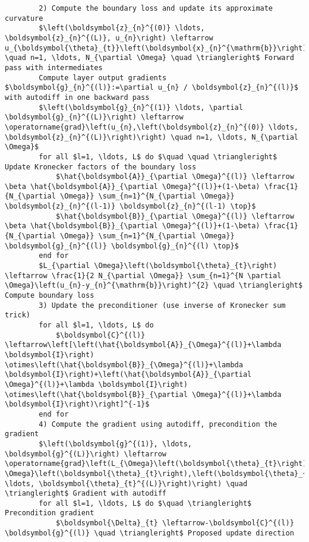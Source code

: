 \documentclass[10pt]{article}
\begin{document}
\begin{verbatim}
        2) Compute the boundary loss and update its approximate curvature
        $\left(\boldsymbol{z}_{n}^{(0)} \ldots, \boldsymbol{z}_{n}^{(L)}, u_{n}\right) \leftarrow u_{\boldsymbol{\theta}_{t}}\left(\boldsymbol{x}_{n}^{\mathrm{b}}\right) \quad n=1, \ldots, N_{\partial \Omega} \quad \triangleright$ Forward pass with intermediates
        Compute layer output gradients $\boldsymbol{g}_{n}^{(l)}:=\partial u_{n} / \boldsymbol{z}_{n}^{(l)}$ with autodiff in one backward pass
        $\left(\boldsymbol{g}_{n}^{(1)} \ldots, \partial \boldsymbol{g}_{n}^{(L)}\right) \leftarrow \operatorname{grad}\left(u_{n},\left(\boldsymbol{z}_{n}^{(0)} \ldots, \boldsymbol{z}_{n}^{(L)}\right)\right) \quad n=1, \ldots, N_{\partial \Omega}$
        for all $l=1, \ldots, L$ do $\quad \quad \triangleright$ Update Kronecker factors of the boundary loss
            $\hat{\boldsymbol{A}}_{\partial \Omega}^{(l)} \leftarrow \beta \hat{\boldsymbol{A}}_{\partial \Omega}^{(l)}+(1-\beta) \frac{1}{N_{\partial \Omega}} \sum_{n=1}^{N_{\partial \Omega}} \boldsymbol{z}_{n}^{(l-1)} \boldsymbol{z}_{n}^{(l-1) \top}$
            $\hat{\boldsymbol{B}}_{\partial \Omega}^{(l)} \leftarrow \beta \hat{\boldsymbol{B}}_{\partial \Omega}^{(l)}+(1-\beta) \frac{1}{N_{\partial \Omega}} \sum_{n=1}^{N_{\partial \Omega}} \boldsymbol{g}_{n}^{(l)} \boldsymbol{g}_{n}^{(l) \top}$
        end for
        $L_{\partial \Omega}\left(\boldsymbol{\theta}_{t}\right) \leftarrow \frac{1}{2 N_{\partial \Omega}} \sum_{n=1}^{N \partial \Omega}\left(u_{n}-y_{n}^{\mathrm{b}}\right)^{2} \quad \triangleright$ Compute boundary loss
        3) Update the preconditioner (use inverse of Kronecker sum trick)
        for all $l=1, \ldots, L$ do
            $\boldsymbol{C}^{(l)} \leftarrow\left[\left(\hat{\boldsymbol{A}}_{\Omega}^{(l)}+\lambda \boldsymbol{I}\right) \otimes\left(\hat{\boldsymbol{B}}_{\Omega}^{(l)}+\lambda \boldsymbol{I}\right)+\left(\hat{\boldsymbol{A}}_{\partial \Omega}^{(l)}+\lambda \boldsymbol{I}\right) \otimes\left(\hat{\boldsymbol{B}}_{\partial \Omega}^{(l)}+\lambda \boldsymbol{I}\right)\right]^{-1}$
        end for
        4) Compute the gradient using autodiff, precondition the gradient
        $\left(\boldsymbol{g}^{(1)}, \ldots, \boldsymbol{g}^{(L)}\right) \leftarrow \operatorname{grad}\left(L_{\Omega}\left(\boldsymbol{\theta}_{t}\right)+L_{\partial \Omega}\left(\boldsymbol{\theta}_{t}\right),\left(\boldsymbol{\theta}_{t}^{(1)}, \ldots, \boldsymbol{\theta}_{t}^{(L)}\right)\right) \quad \triangleright$ Gradient with autodiff
        for all $l=1, \ldots, L$ do $\quad \triangleright$ Precondition gradient
            $\boldsymbol{\Delta}_{t} \leftarrow-\boldsymbol{C}^{(l)} \boldsymbol{g}^{(l)} \quad \triangleright$ Proposed update direction

\end{verbatim}
\end{document}

